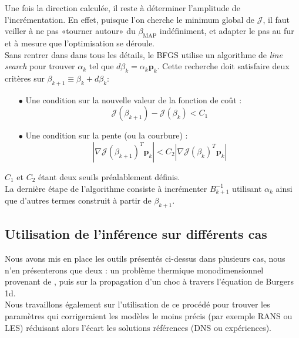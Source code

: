 \documentclass[a4paper,12pt]{article}
\newcommand{\bepar}[1]{
	\left( #1 \right)  
}
\newcommand{\bmap}{\beta_{\text{MAP}}}
\newcommand{\J}{\mathcal{J}}
\newcommand\bk{\color{black}}
\newcommand\brick{\color{brick}}
\numberwithin{equation}{section} %
\begin{document}
\noindent Une fois la direction calculée, il reste à déterminer l'amplitude de l'incrémentation. En effet, puisque l'on cherche le minimum global de $\J$, il faut veiller à ne pas «tourner autour» du $\bmap$ indéfiniment, et adapter le pas au fur et à mesure que l'optimisation se déroule.\\ 
Sans rentrer dans dans tous les détails, le BFGS utilise un algorithme de \textit{line search} pour trouver $ \displaystyle \alpha_k$ tel que $d\beta_k = \alpha_k\mathbf{p}_k$. Cette recherche doit satisfaire deux critères sur $\beta_{k+1}\equiv\beta_k+ d\beta_k $: 
\begin{itemize}
\item[$\bullet$] Une condition sur la nouvelle valeur de la fonction de coût : \begin{equation}
\J\bepar{\beta_{k+1}} - \J\bepar{\beta_k} < C_1
\end{equation} 

\item[$\bullet$] Une condition sur la pente (ou la courbure) : 
\begin{equation}
|\nabla\J \bepar{\beta_{k+1}}^T\textbf{p}_k| < C_2 |\nabla\J \bepar{\beta_k}^T\textbf{p}_k|
\end{equation}
\end{itemize} 
$C_1$ et $C_2$ étant deux seuils préalablement définis.\\
La dernière étape de l'algorithme consiste à incrémenter $B_{k+1}^{-1}$ utilisant $\alpha_k$ ainsi que d'autres termes construit à partir de $\beta_{k+1}$.\\

\pagebreak

\brick \subsection{Utilisation de l'inférence sur différents cas} \bk

\noindent Nous avons mis en place les outils présentés ci-dessus dans plusieurs cas, nous n'en présenterons que deux : un problème thermique monodimensionnel provenant de \citep{parish2016paradigm}, puis sur la propagation d'un choc à travers l'équation de Burgers 1d. \\
Nous travaillons également sur l'utilisation de ce procédé pour trouver les paramètres  qui corrigeraient les modèles le moins précis (par exemple RANS ou LES) réduisant alors l'écart les solutions références (DNS ou expériences).
\end{document}
